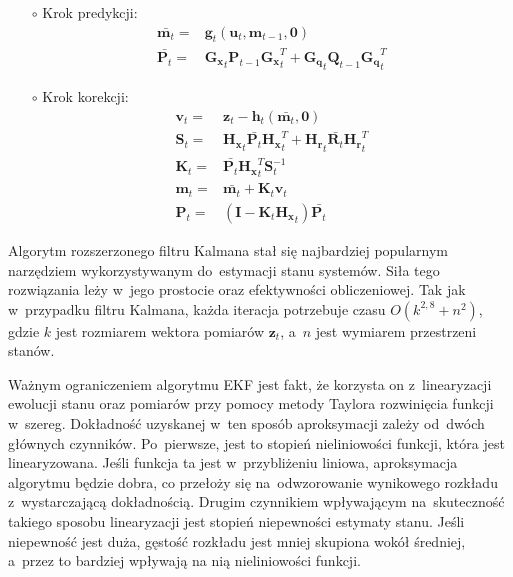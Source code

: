 \begin{itemize}
	\item[$\circ$] Krok predykcji:
	\begin{align}
	\bar{\boldsymbol{m}_{t}} =& \boldsymbol{g}_t(\boldsymbol{u}_t, \boldsymbol{m}_{t-1}, \boldsymbol{0}) \nonumber \\
	\bar{\mathbf{P}_{t}} =& \mathbf{G_x}_{t} \mathbf{P}_{t-1} \mathbf{G_x}_{t}^T + \mathbf{G_q}_{t} \mathbf{Q}_{t-1} \mathbf{G_q}_{t}^T
	\end{align}
	\item[$\circ$] Krok korekcji:
	\begin{align}
	\mathbf{v}_t=&\mathbf{z}_t-\boldsymbol{h}_t(\bar{\boldsymbol{m}_{t}}, \boldsymbol{0}) \nonumber \\
	\mathbf{S}_t=&\mathbf{H_x}_t \bar{\mathbf{P}_{t}} \mathbf{H_x}_t^T + \mathbf{H_r}_t \bar{\mathbf{R}_{t}} \mathbf{H_r}_t^T \nonumber \\
	\mathbf{K}_t=&\bar{\mathbf{P}_{t}} \mathbf{H_x}_t^T \mathbf{S}_t^{-1}\nonumber \\
	\mathbf{m}_{t}=&\bar{\mathbf{m}_{t}} + \mathbf{K}_t \mathbf{v}_t\nonumber \\
	\mathbf{P}_{t}=&(\mathbf{I} - \mathbf{K}_t \mathbf{H_x}_t) \bar{\mathbf{P}_{t}}
	\end{align}
\end{itemize}
\par
Algorytm rozszerzonego filtru Kalmana stał się najbardziej popularnym narzędziem wykorzystywanym do~estymacji stanu systemów. Siła tego rozwiązania leży w~jego prostocie oraz efektywności obliczeniowej. Tak jak w~przypadku filtru Kalmana, każda iteracja potrzebuje czasu $O(k^{2,8} + n^2)$, gdzie $k$ jest rozmiarem wektora pomiarów $\boldsymbol{z}_t$, a~$n$ jest wymiarem przestrzeni stanów.
\par
Ważnym ograniczeniem algorytmu EKF jest fakt, że korzysta on z~linearyzacji ewolucji stanu oraz pomiarów przy pomocy metody Taylora rozwinięcia funkcji w~szereg. Dokładność uzyskanej w~ten sposób aproksymacji zależy od~dwóch głównych czynników. Po~pierwsze, jest to stopień nieliniowości funkcji, która jest linearyzowana. Jeśli funkcja ta jest w~przybliżeniu liniowa, aproksymacja algorytmu będzie dobra, co przełoży się na~odwzorowanie wynikowego rozkładu z~wystarczającą dokładnością. Drugim czynnikiem wpływającym na~skuteczność takiego sposobu linearyzacji jest stopień niepewności estymaty stanu. Jeśli niepewność jest duża, gęstość rozkładu jest mniej skupiona wokół średniej, a~przez to bardziej wpływają na nią nieliniowości funkcji.
